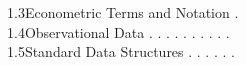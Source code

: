 1.3\quad Econometric Terms and Notation .\\
1.4\quad Observational Data . . . . . . . . . .\\
1.5\quad Standard Data Structures . . . . . .